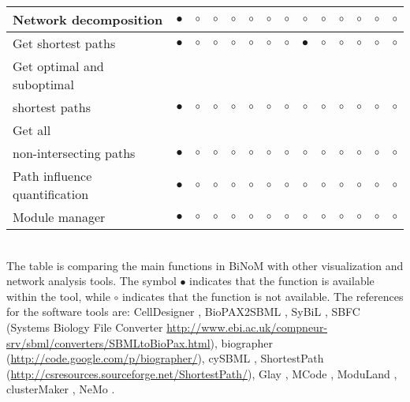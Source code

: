 \documentclass[11pt]{bmc_article_s50}
\newenvironment{bmcformat}{\begin{raggedright}\baselineskip20pt\sloppy\setboolean{publ}{false}}{\end{raggedright}\baselineskip20pt\sloppy}
\begin{document}
\begin{bmcformat}
\begin{sidewaystable}
\begin{tabular}{lccccccccccccc}
        Network decomposition & $\bullet$      &$\circ$&$\circ$& $\circ$      & $\circ$       & $\circ$           & $\circ$     & $\circ$               &  $\circ$      &  $\circ$       &  $\circ$           & $\circ$            &  $\circ$      \\ \hline
        Get shortest paths    & $\bullet$      &$\circ$&$\circ$& $\circ$      & $\circ$       & $\circ$           & $\circ$     & $\bullet$               &  $\circ$      &  $\circ$       &  $\circ$           & $\circ$            &  $\circ$      \\ \hline
        Get optimal and suboptimal & & & & & & & & & & & & &
          \\shortest paths    & $\bullet$      &$\circ$&$\circ$& $\circ$      & $\circ$       & $\circ$           & $\circ$     & $\circ$               &  $\circ$      &  $\circ$       &  $\circ$           & $\circ$            &  $\circ$      \\ \hline
        Get all  & & & & & & & & & & & & &
          \\non-intersecting paths    & $\bullet$      &$\circ$&$\circ$& $\circ$      & $\circ$       & $\circ$           & $\circ$     & $\circ$               &  $\circ$      &  $\circ$       &  $\circ$           & $\circ$            &  $\circ$      \\ \hline
        Path influence quantification & $\bullet$      &$\circ$&$\circ$& $\circ$      & $\circ$       & $\circ$           & $\circ$     & $\circ$               &  $\circ$      &  $\circ$       &  $\circ$           & $\circ$            &  $\circ$      \\ \hline
        Module manager       & $\bullet$      &$\circ$&$\circ$& $\circ$      & $\circ$       & $\circ$           & $\circ$     & $\circ$               &  $\circ$      &  $\circ$       &  $\circ$           & $\circ$            &  $\circ$      \\
        \hline
      \end{tabular}\\
 The table is comparing the main functions in BiNoM with other visualization
 and network analysis tools. The symbol $\bullet$ indicates that the function is
 available within the tool, while $\circ$ indicates that the function is not
 available. The references for the software tools are: CellDesigner
 \cite{funahashi2003celldesigner, mi2011biopax}, BioPAX2SBML
 \cite{buchel2012qualitative}, SyBiL  \cite{ruebenacker2009integrating}, SBFC
 (Systems Biology File Converter
 \url{http://www.ebi.ac.uk/compneur-srv/sbml/converters/SBMLtoBioPax.html}),
 biographer (\url{http://code.google.com/p/biographer/}), cySBML
 \cite{konig2012cysbml}, ShortestPath
 (\url{http://csresources.sourceforge.net/ShortestPath/}), Glay
 \cite{su2010glay}, MCode \cite{bader2003automated}, ModuLand
 \cite{szalay2012moduland}, clusterMaker \cite{morris2011clustermaker}, NeMo
 \cite{rivera2010nemo}.


\end{sidewaystable}
\end{bmcformat}
\end{document}
